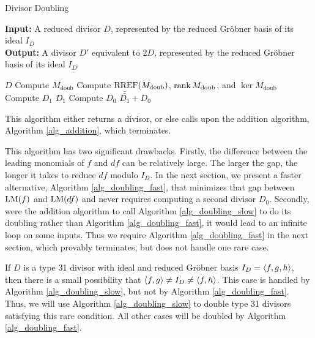 \begin{algorithm}
  \caption{Divisor Doubling}
  \label{alg_doubling_slow}
  {\bf Input:} A reduced divisor $D$, represented by the reduced Gr\"obner basis of its ideal $I_D$ \\
  {\bf Output:} A divisor $D'$ equivalent to $2D$, represented by the reduced Gr\"obner basis of its ideal $I_{D'}$
  \begin{algorithmic}[1]
      \State \Return $D$ \label{alg_doubling:return_0}
    \EndIf
    \State Compute $M_{\text{doub}}$
    \State Compute $\operatorname{RREF}(M_{\text{doub}})$, $\operatorname{rank} M_{\text{doub}}$, and $\ker M_{\text{doub}}$
    \State Compute $D_1$
      \State \Return $D_1$ \label{alg_doubling:return_1}
    \EndIf
    \State Compute $D_0$
    \State \Return $\bar{\bar{D_1}} + D_0$ \label{alg_doubling:return_2}
  \end{algorithmic}
\end{algorithm}

This algorithm either returns a divisor, or else calls upon the addition algorithm,
Algorithm \ref{alg_addition}, which terminates.

This algorithm has two significant drawbacks.
Firstly, the difference between the leading monomials of $f$ and $df$ can be relatively large.
The larger the gap, the longer it takes to reduce $df$ modulo $I_D$.
In the next section, we present a faster alternative, Algorithm \ref{alg_doubling_fast},
that minimizes that gap between $\operatorname{LM}(f)$ and $\operatorname{LM}(df)$ and never requires computing a second divisor $D_0$.
Secondly, were the addition algorithm to call Algorithm \ref{alg_doubling_slow} to do its doubling
rather than Algorithm \ref{alg_doubling_fast},
it would lead to an infinite loop on some inputs.
Thus we require Algorithm \ref{alg_doubling_fast} in the next section,
which provably terminates, but does not handle one rare case.

If $D$ is a type 31 divisor with ideal and reduced Gr\"obner basis $I_D = \left\langle f,g,h \right\rangle$,
then there is a small possibility that $\left\langle f,g \right\rangle \neq I_D \neq \left\langle f,h \right\rangle$.
This case is handled by Algorithm \ref{alg_doubling_slow}, but not by Algorithm \ref{alg_doubling_fast}.
Thus, we will use Algorithm \ref{alg_doubling_slow} to double type 31 divisors satisfying this rare condition.
All other cases will be doubled by Algorithm \ref{alg_doubling_fast}.




